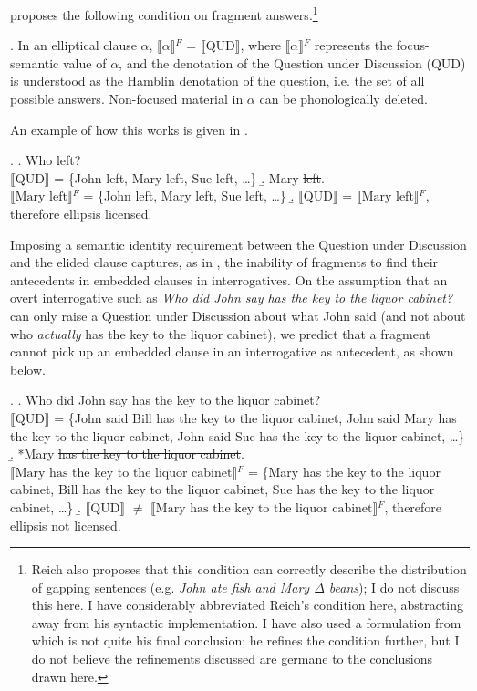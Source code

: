 \documentclass[doublespace]{umthesis}
\newcommand{\ext}[1]{\ensuremath{\llbracket \textrm{{#1}} \rrbracket}}
\begin{document}
\cite{Re07} proposes the following condition on fragment answers.\footnote{Reich also proposes that this condition can correctly describe the distribution of gapping sentences (e.g. {\it John ate fish and Mary $\Delta$ beans}); I do not discuss this here. I have considerably abbreviated Reich's condition here, abstracting away from his syntactic implementation. I have also used a formulation from \cite{Re07} which is not quite his final conclusion; he refines the condition further, but I do not believe the refinements discussed are germane to the conclusions drawn here.}

\ex. 	In an elliptical clause $\alpha$, \ext{$\alpha$}$^F$ = \ext{QUD}, where \ext{$\alpha$}$^F$ represents the focus-semantic value of $\alpha$, and the denotation of the Question under Discussion (QUD) is understood as the Hamblin denotation of the question, i.e. the set of all possible answers. Non-focused material in $\alpha$ can be phonologically deleted.

An example of how this works is given in \Next.

\ex. 	\a. Who left?\\
		\ext{QUD} = \{John left, Mary left, Sue left, \ldots\}
	\b. Mary \sout{left}.\\
		\ext{Mary left}$^F$ = \{John left, Mary left, Sue left, \ldots\}
	\b. \ext{QUD} = \ext{Mary left}$^F$, therefore ellipsis licensed.
	
Imposing a semantic identity requirement between the Question under Discussion and the elided clause captures, as in \cite{Kr06}, the inability of fragments to find their antecedents in embedded clauses in interrogatives. On the assumption that an overt interrogative such as {\it Who did John say has the key to the liquor cabinet?} can only raise a Question under Discussion about what John said (and not about who \emph{actually} has the key to the liquor cabinet), we predict that a fragment cannot pick up an embedded clause in an interrogative as antecedent, as shown below.

\ex. 	\a. Who did John say has the key to the liquor cabinet?\\
		\ext{QUD} = \{John said Bill has the key to the liquor cabinet, John said Mary has the key to the liquor cabinet, John said Sue has the key to the liquor cabinet, \ldots\}
	\b. *Mary \sout{has the key to the liquor cabinet}.\\
		\ext{Mary has the key to the liquor cabinet}$^F$ = \{Mary has the key to the liquor cabinet, Bill has the key to the liquor cabinet, Sue has the key to the liquor cabinet, \ldots\}
	\b. \ext{QUD} $\neq$ \ext{Mary has the key to the liquor cabinet}$^F$, therefore ellipsis not licensed.
	
\end{document}
